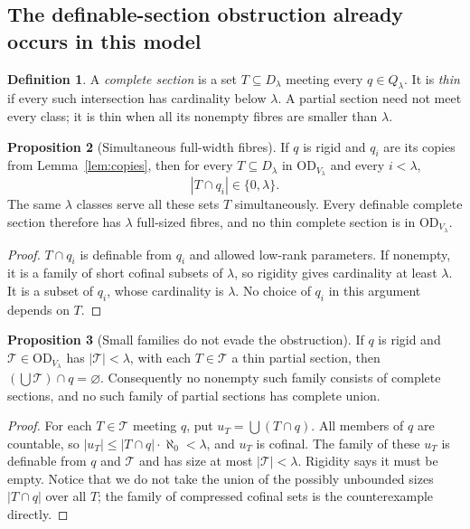 \documentclass[11pt,letterpaper]{article}
\theoremstyle{definition}
\newtheorem{definition}{Definition}[section]
\newtheorem{proposition}[definition]{Proposition}
\numberwithin{equation}{section}
\newcommand{\OD}{\mathrm{OD}}
\begin{document}
\subsection{The definable-section obstruction already occurs in this model}

\begin{definition}
A \emph{complete section} is a set $T\subseteq D_\lambda$ meeting every
$q\in Q_\lambda$. It is \emph{thin} if every such intersection has
cardinality below $\lambda$. A partial section need not meet every class;
it is thin when all its nonempty fibres are smaller than $\lambda$.
\end{definition}

\begin{proposition}[Simultaneous full-width fibres]\label{prop:width}
If $q$ is rigid and $q_i$ are its copies from Lemma~\ref{lem:copies}, then
for every $T\subseteq D_\lambda$ in $\OD_{V_\lambda}$ and every $i<\lambda$,
\[
 |T\cap q_i|\in\{0,\lambda\}.
\]
The same $\lambda$ classes serve all these sets $T$ simultaneously.
Every definable complete section therefore has $\lambda$ full-sized fibres,
and no thin complete section is in $\OD_{V_\lambda}$.
\end{proposition}
\begin{proof}
$T\cap q_i$ is definable from $q_i$ and allowed low-rank parameters.
If nonempty, it is a family of short cofinal subsets of $\lambda$, so
rigidity gives cardinality at least $\lambda$. It is a subset of $q_i$,
whose cardinality is $\lambda$. No choice of $q_i$ in this argument depends
on $T$.
\end{proof}

\begin{proposition}[Small families do not evade the obstruction]\label{prop:smallfamily}
If $q$ is rigid and $\mathcal T\in\OD_{V_\lambda}$ has
$|\mathcal T|<\lambda$, with each $T\in\mathcal T$ a thin partial section,
then $(\bigcup\mathcal T)\cap q=\varnothing$.
Consequently no nonempty such family consists of complete sections,
and no such family of partial sections has complete union.
\end{proposition}
\begin{proof}
For each $T\in\mathcal T$ meeting $q$, put
$u_T=\bigcup(T\cap q)$. All members of $q$ are countable, so
$|u_T|\le |T\cap q|\cdot\aleph_0<\lambda$, and $u_T$ is cofinal.
The family of these $u_T$ is definable from $q$ and $\mathcal T$ and has
size at most $|\mathcal T|<\lambda$. Rigidity says it must be empty.
Notice that we do not take the union of the possibly unbounded sizes
$|T\cap q|$ over all $T$; the family of compressed cofinal sets is the
counterexample directly.
\end{proof}
\end{document}
